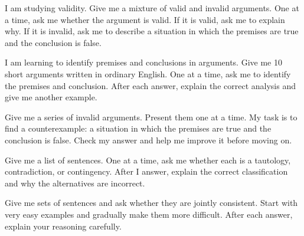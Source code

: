 \begin{genaipractice}[]
\item I am studying validity. Give me a mixture of valid and invalid arguments. One at a time, ask me whether the argument is valid. If it is valid, ask me to explain why. If it is invalid, ask me to describe a situation in which the premises are true and the conclusion is false.
\item I am learning to identify premises and conclusions in arguments. Give me 10 short arguments written in ordinary English. One at a time, ask me to identify the premises and conclusion. After each answer, explain the correct analysis and give me another example.
\item Give me a series of invalid arguments. Present them one at a time. My task is to find a counterexample: a situation in which the premises are true and the conclusion is false. Check my answer and help me improve it before moving on.
\item Give me a list of sentences. One at a time, ask me whether each is a tautology, contradiction, or contingency. After I answer, explain the correct classification and why the alternatives are incorrect.
\item Give me sets of sentences and ask whether they are jointly consistent. Start with very easy examples and gradually make them more difficult. After each answer, explain your reasoning carefully.
\end{genaipractice}